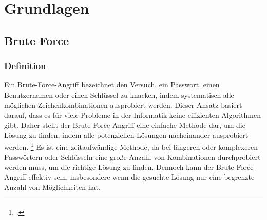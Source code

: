 \section{Grundlagen}
\subsection{Brute Force}
\subsubsection{Definition}
Ein Brute-Force-Angriff bezeichnet den Versuch, ein Passwort, einen Benutzernamen oder einen Schlüssel zu knacken, indem systematisch alle möglichen Zeichenkombinationen ausprobiert werden. 
Dieser Ansatz basiert darauf, dass es für viele Probleme in der Informatik keine effizienten Algorithmen gibt. 
Daher stellt der Brute-Force-Angriff eine einfache Methode dar, um die Lösung zu finden, indem alle potenziellen Lösungen nacheinander ausprobiert werden. \footcite[Vgl.][]{Wikipedia}
Es ist eine zeitaufwändige Methode, da bei längeren oder komplexeren Passwörtern oder Schlüsseln eine große Anzahl von Kombinationen durchprobiert werden muss, um die richtige Lösung zu finden. 
Dennoch kann der Brute-Force-Angriff effektiv sein, insbesondere wenn die gesuchte Lösung nur eine begrenzte Anzahl von Möglichkeiten hat.
